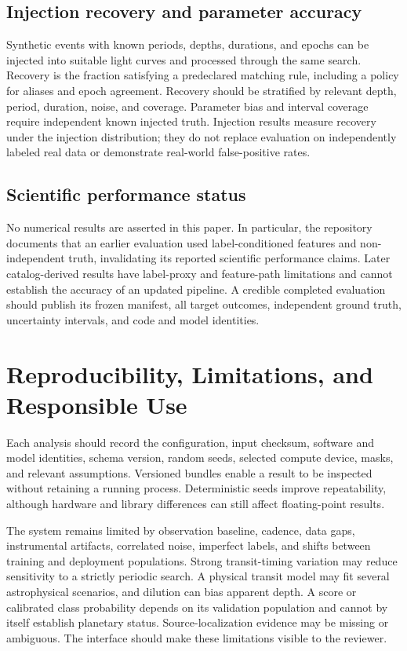 \documentclass[11pt,a4paper]{article}
\begin{document}
\subsection{Injection recovery and parameter accuracy}
Synthetic events with known periods, depths, durations, and epochs can be injected into suitable light curves and processed through the same search. Recovery is the fraction satisfying a predeclared matching rule, including a policy for aliases and epoch agreement. Recovery should be stratified by relevant depth, period, duration, noise, and coverage. Parameter bias and interval coverage require independent known injected truth. Injection results measure recovery under the injection distribution; they do not replace evaluation on independently labeled real data or demonstrate real-world false-positive rates.

\subsection{Scientific performance status}
No numerical results are asserted in this paper. In particular, the repository documents that an earlier evaluation used label-conditioned features and non-independent truth, invalidating its reported scientific performance claims. Later catalog-derived results have label-proxy and feature-path limitations and cannot establish the accuracy of an updated pipeline. A credible completed evaluation should publish its frozen manifest, all target outcomes, independent ground truth, uncertainty intervals, and code and model identities.

\section{Reproducibility, Limitations, and Responsible Use}
Each analysis should record the configuration, input checksum, software and model identities, schema version, random seeds, selected compute device, masks, and relevant assumptions. Versioned bundles enable a result to be inspected without retaining a running process. Deterministic seeds improve repeatability, although hardware and library differences can still affect floating-point results.

The system remains limited by observation baseline, cadence, data gaps, instrumental artifacts, correlated noise, imperfect labels, and shifts between training and deployment populations. Strong transit-timing variation may reduce sensitivity to a strictly periodic search. A physical transit model may fit several astrophysical scenarios, and dilution can bias apparent depth. A score or calibrated class probability depends on its validation population and cannot by itself establish planetary status. Source-localization evidence may be missing or ambiguous. The interface should make these limitations visible to the reviewer.
\end{document}
